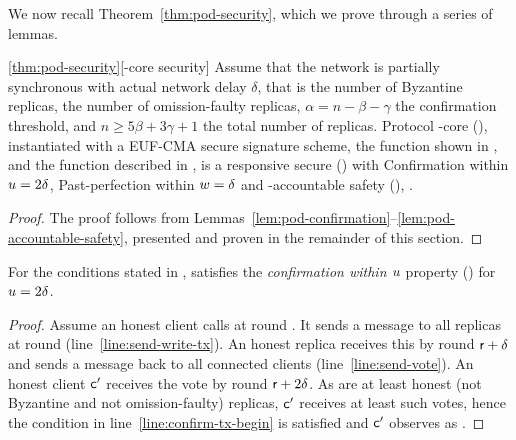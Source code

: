 
\noindent

We now recall Theorem~\ref{thm:pod-security}, which we prove through a series of lemmas.

\begin{customthm}{\ref{thm:pod-security}}[\podtm-core security]
	Assume that the network is partially synchronous with actual network delay $\delta$, that \beta is the number of Byzantine replicas, \gamma the number of omission-faulty replicas, $\alpha = n - \beta - \gamma$ the confirmation threshold, and $n \geq 5 \beta + 3 \gamma + 1$ the total number of replicas. Protocol \podtm-core (), instantiated with a EUF-CMA secure signature scheme, the \opValid{} function shown in , and the \identify{} function described in , is a responsive secure \podtm () with Confirmation within $u = 2 \delta$, Past-perfection within $w = \delta$ and  \beta-accountable safety (), \ewnp.
\end{customthm}
\begin{proof}
	The proof follows from Lemmas~\ref{lem:pod-confirmation}--\ref{lem:pod-accountable-safety}, presented and proven in the remainder of this section.
\end{proof}

\begin{lemma}\label{lem:pod-confirmation}
	For the conditions stated in ,  satisfies the \emph{confirmation within $u$} property () for $u = 2 \delta$.
\end{lemma}
\begin{proof}
	Assume an honest client \client calls \opwrite{\tx} at round \round.
	It sends a message \msgwrite{\tx} to all replicas at round \round (line~\ref{line:send-write-tx}).
	An honest replica receives this by round $\textsf{r} + \delta$ and sends a \msgrecord{} message back to all connected clients (line~\ref{line:send-vote}).
	An honest client $\textsf{c}'$ receives the vote by round $\textsf{r} + 2\delta$.
	As are at least \alpha honest (not Byzantine and not omission-faulty) replicas, $\textsf{c}'$ receives at least \alpha such votes, hence the condition in line~\ref{line:confirm-tx-begin} is satisfied and $\textsf{c}'$ observes \tx as \confirmed.
\end{proof}

